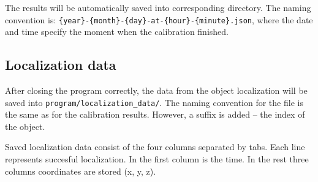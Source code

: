 
The results will be automatically saved into corresponding directory. The
naming convention is: \verb+{year}-{month}-{day}-at-{hour}-{minute}.json+,
where the date and time specify the moment when the calibration finished.

\subsection{Localization data}
After closing the program correctly, the data from the object localization will
be saved into \verb+program/localization_data/+. The naming convention for the
file is the same as for the calibration results. However, a suffix is added --
the index of the object.

Saved localization data consist of the four columns separated by tabs. Each
line represents succesful localization. In the first column is the time. In the
rest three columns coordinates are stored (x, y, z).
